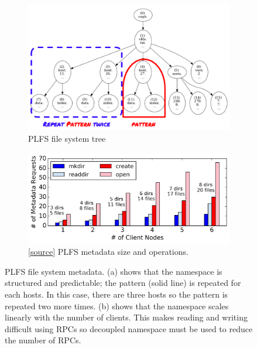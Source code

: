 \begin{figure}[tb]
    \centering
    \begin{subfigure}[b]{.45\linewidth}
      \centering
      \includegraphics[width=1\linewidth]{figures/tree_plfs.png} 
      \caption{PLFS file system tree}\label{fig:tree_plfs}
   \end{subfigure}
   \begin{subfigure}[b]{.45\linewidth}
     \centering
     \includegraphics[width=1\linewidth]{figures/plfs_problem.png} 
     \caption{[\href{https://github.com/michaelsevilla/tintenfisch-popper/blob/master/experiments/n1/vizualize.ipynb}{source}]
     PLFS metadata size and operations.}
     \label{fig:plfs_problem}
   \end{subfigure}
\caption{PLFS file system metadata. (a) shows that the namespace is structured
and predictable; the pattern (solid line) is repeated for each hosts. In this
case, there are three hosts so the pattern is repeated two more times. (b)
shows that the namespace scales linearly with the number of clients.  This
makes reading and writing difficult using RPCs so decoupled namespace must be
used to reduce the number of RPCs.}
\end{figure}


